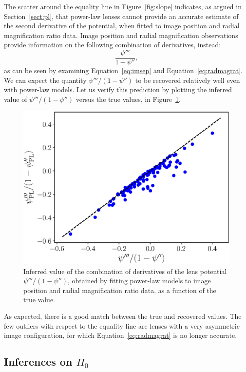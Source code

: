 \documentclass[usenatbib]{mnras}
\def\psiii{\psi''}
\def\psiiii{\psi'''}
\def\Sref#1{Section~\ref{#1}\xspace}
\def\Fref#1{Figure~\ref{#1}\xspace}
\def\Eref#1{Equation~\ref{#1}\xspace}
\begin{document}
The scatter around the equality line in \Fref{fig:slope} indicates, as argued in \Sref{sect:pl}, that power-law lenses cannot provide an accurate estimate of the second derivative of the potential, when fitted to image position and radial magnification ratio data.
Image position and radial magnification observations provide information on the following combination of derivatives, instead:
\begin{equation}\label{eq:psicomb}
\frac{\psiiii}{1 - \psiii},
\end{equation}
as can be seen by examining \Eref{eq:imsep} and \Eref{eq:radmagrat}.
We can expect the quantity $\psiiii/(1-\psiii)$ to be recovered relatively well even with power-law models. Let us verify this prediction by plotting the inferred value of $\psiiii/(1-\psiii)$ versus the true values, in \Fref{fig:psicomb}.
%
\begin{figure}
 \includegraphics[width=\columnwidth]{psicomb.eps}
 \caption{
Inferred value of the combination of derivatives of the lens potential $\psiiii/(1-\psiii)$, obtained by fitting power-law models to image position and radial magnification ratio data, as a function of the true value. 
}
 \label{fig:psicomb}
\end{figure}
%
As expected, there is a good match between the true and recovered values.
The few outliers with respect to the equality line are lenses with a very asymmetric image configuration, for which \Eref{eq:radmagrat} is no longer accurate.

\subsection{Inferences on $H_0$}
\end{document}
